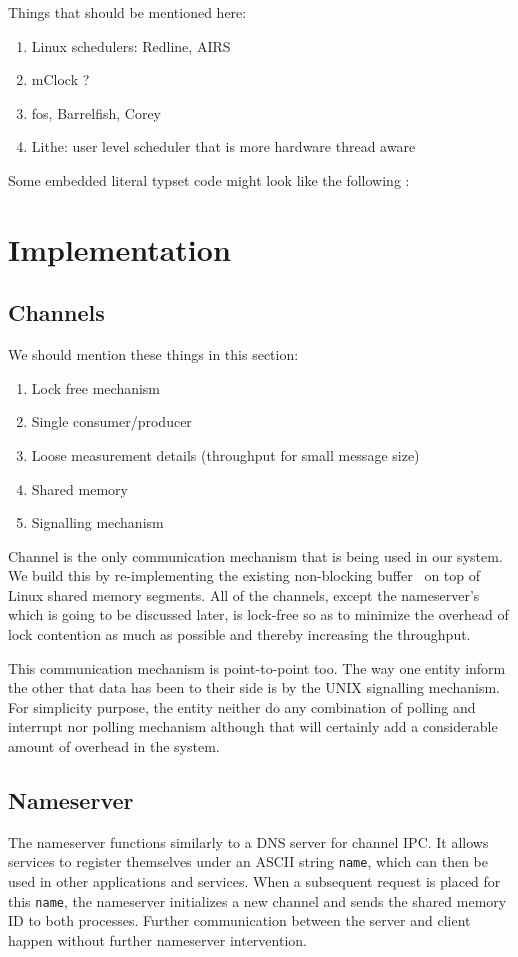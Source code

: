 \documentclass[letterpaper,twocolumn,10pt]{article}
\begin{document}
Things that should be mentioned here:
\begin{enumerate}
\item Linux schedulers: Redline, AIRS
\item mClock ?
\item fos, Barrelfish, Corey
\item Lithe: user level scheduler that is more hardware thread aware
\end{enumerate}

Some embedded literal typset code might 
look like the following :

\section{Implementation}
\subsection{Channels}
We should mention these things in this section:
\begin{enumerate}
\item Lock free mechanism
\item Single consumer/producer
\item Loose measurement details (throughput for small message size)
\item Shared memory
\item Signalling mechanism
\end{enumerate}

Channel is the only communication mechanism that is being used in our system. We build this by re-implementing the existing non-blocking buffer~\cite{Kim:2007:EAN:1260991.1261857} on top of Linux shared memory segments. All of the channels, except the nameserver's which is going to be discussed later, is lock-free so as to minimize the overhead of lock contention as much as possible and thereby increasing the throughput.

This communication mechanism is point-to-point too. The way one entity inform the other that data has been to their side is by the UNIX signalling mechanism. For simplicity purpose, the entity neither do any combination of polling and interrupt nor polling mechanism although that will certainly add a considerable amount of overhead in the system.


\subsection{Nameserver}
The nameserver functions similarly to a DNS server for channel IPC. It allows services to register themselves under an ASCII string {\tt name}, which can then be used in other applications and services. When a subsequent request is placed for this {\tt name}, the nameserver initializes a new channel and sends the shared memory ID to both processes. Further communication between the server and client happen without further nameserver intervention.
\end{document}
